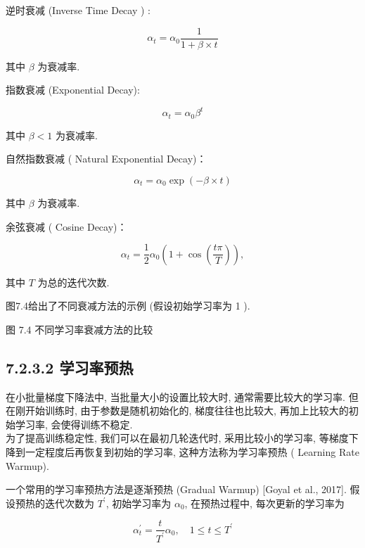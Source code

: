\documentclass[10pt]{article}
\begin{document}
逆时衰减 (Inverse Time Decay ) :


\begin{equation*}
\alpha_{t}=\alpha_{0} \frac{1}{1+\beta \times t} \tag{7.5}
\end{equation*}


其中 $\beta$ 为衰减率.

指数衰减 (Exponential Decay):


\begin{equation*}
\alpha_{t}=\alpha_{0} \beta^{t} \tag{7.6}
\end{equation*}


其中 $\beta<1$ 为衰减率.

自然指数衰减 ( Natural Exponential Decay)：


\begin{equation*}
\alpha_{t}=\alpha_{0} \exp (-\beta \times t) \tag{7.7}
\end{equation*}


其中 $\beta$ 为衰减率.

余弦衰减 ( Cosine Decay)：


\begin{equation*}
\alpha_{t}=\frac{1}{2} \alpha_{0}\left(1+\cos \left(\frac{t \pi}{T}\right)\right), \tag{7.8}
\end{equation*}


其中 $T$ 为总的迭代次数.

图7.4给出了不同衰减方法的示例 (假设初始学习率为 1 ).



图 7.4 不同学习率衰减方法的比较

\subsection*{7.2.3.2 学习率预热}
在小批量梯度下降法中, 当批量大小的设置比较大时, 通常需要比较大的学习率. 但在刚开始训练时, 由于参数是随机初始化的, 梯度往往也比较大, 再加上比较大的初始学习率, 会使得训练不稳定.\\
为了提高训练稳定性, 我们可以在最初几轮迭代时, 采用比较小的学习率, 等梯度下降到一定程度后再恢复到初始的学习率, 这种方法称为学习率预热 ( Learning Rate Warmup).

一个常用的学习率预热方法是逐渐预热 (Gradual Warmup) [Goyal et al., 2017]. 假设预热的迭代次数为 $T^{\prime}$, 初始学习率为 $\alpha_{0}$, 在预热过程中, 每次更新的学习率为


\begin{equation*}
\alpha_{t}^{\prime}=\frac{t}{T^{\prime}} \alpha_{0}, \quad 1 \leq t \leq T^{\prime} \tag{7.9}
\end{equation*}
\end{document}
